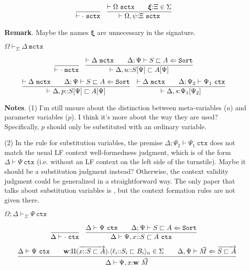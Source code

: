 \documentclass[letterpaper, 11pt]{article}
\newcommand{\Lar}{\Leftarrow}
\newcommand{\Sort}{\texttt{Sort}}
\newcommand{\ctx}{\texttt{ctx}}
\newcommand{\mctx}{\texttt{mctx}}
\newcommand{\sctx}{\texttt{sctx}}
\begin{document}
    \begin{align*}
      & \infer{\vdash \cdot \ \sctx}{} &
      & \infer{\vdash \Omega, \psi {:} \Xi \ \sctx}
        {
          \vdash \Omega \ \sctx
          &&
          \boldsymbol{\xi} {:} \Xi \in \Sigma
        }
    \end{align*}

    \textbf{Remark}.  Maybe the names $\boldsymbol{\xi}$ are unnecessary in the signature.

    $\boxed{\Omega \vdash_\Sigma \Delta \ \mctx}$

    \begin{align*}
      & \infer{\vdash \cdot \ \mctx}{} &
      & \infer{\vdash \Delta, u{::} S[\Psi] \sqsubset A[\Psi]}
        {
          \vdash \Delta \ \mctx
          &&
          \Delta ; \Psi \vdash S \sqsubset A \Lar \Sort
        }
    \end{align*}
    \begin{align*}
      & \infer{\vdash \Delta, p{::} S[\Psi] \sqsubset A[\Psi]}
        {
          \vdash \Delta \ \mctx
          &&
          \Delta ; \Psi \vdash S \sqsubset A \Lar \Sort
        } &
      & \infer{\vdash \Delta, s{:} \Psi_1[\Psi_2]}
        {
          \vdash \Delta \ \mctx
          &&
          \Delta ; \Psi_2 \vdash \Psi_1 \ \ctx
        }
    \end{align*}

    \textbf{Notes}. (1) I'm still unsure about the distinction between meta-variables ($u$) and parameter variables ($p$).  I think it's more about 
    the way they are used?  Specifically, $p$ should only be substituted with an ordinary variable.

    (2) In the rule for substitution variables, the premise $\Delta ; \Psi_2 \vdash \Psi_1 \ \ctx$ does not match the usual LF context well-formedness
    judgment, which is of the form $\Delta \vdash \Psi \ \ctx$ (i.e. without an LF context on the left side of the turnstile).  Maybe it should be
    a substitution judgment instead?  Otherwise, the context validity judgment could be generalized in a straightforward way. The only paper that 
    talks about substitution variables is \cite{Pientka2008}, but the context formation rules are not given there.

    $\boxed{\Omega ; \Delta \vdash_\Sigma \Psi \ \ctx}$

    \begin{align*}
      & \infer{\Delta \vdash \cdot \ \ctx}{} &
      & \infer{\Delta \vdash \Psi, x {::}S \sqsubset A \ \ctx}
        {
          \Delta \vdash \Psi \ \ctx
          &&
          \Delta ; \Psi \vdash S \sqsubset A \Lar \Sort
        }
    \end{align*}
    \begin{align*}
      \infer{\Delta \vdash \Psi, x{:} \textbf{w} \ \vec{M}}
            {
              \Delta \vdash \Psi \ \ctx
              &&
              \textbf{w} {:} \Pi (\overrightarrow{x{::}S \sqsubset A}).\langle \ell_i {::} S_i \sqsubset B_i \rangle_n \in \Sigma
              &&
              \Delta, \Psi \vdash \vec{M} \Lar \overrightarrow{S \sqsubset A}
            }
    \end{align*}
\end{document}
